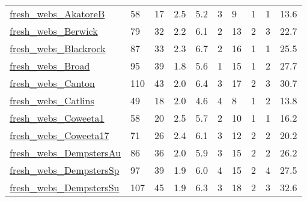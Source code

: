 \begin{longtable}{llllllllll}
 \href{https://iwdb.nceas.ucsb.edu/html/thomps_towns.html}{fresh\_webs\_AkatoreB}                                             & 58         & 17    & 2.5    & 5.2    & 3     & 9      & 1      & 1      & 13.6    \\
 \href{https://iwdb.nceas.ucsb.edu/html/thomps_towns.html}{fresh\_webs\_Berwick}                                              & 79         & 32    & 2.2    & 6.1    & 2     & 13     & 2      & 3      & 22.7    \\
 \href{https://iwdb.nceas.ucsb.edu/html/thomps_towns.html}{fresh\_webs\_Blackrock}                                            & 87         & 33    & 2.3    & 6.7    & 2     & 16     & 1      & 1      & 25.5    \\
 \href{https://iwdb.nceas.ucsb.edu/html/thomps_towns.html}{fresh\_webs\_Broad}                                                & 95         & 39    & 1.8    & 5.6    & 1     & 15     & 1      & 2      & 27.7    \\
 \href{https://iwdb.nceas.ucsb.edu/html/thomps_towns.html}{fresh\_webs\_Canton}                                               & 110        & 43    & 2.0    & 6.4    & 3     & 17     & 2      & 3      & 30.7    \\
 \href{https://iwdb.nceas.ucsb.edu/html/thomps_towns.html}{fresh\_webs\_Catlins}                                              & 49         & 18    & 2.0    & 4.6    & 4     & 8      & 1      & 2      & 13.8    \\
 \href{https://iwdb.nceas.ucsb.edu/html/thomps_towns.html}{fresh\_webs\_Coweeta1}                                             & 58         & 20    & 2.5    & 5.7    & 2     & 10     & 1      & 1      & 16.2    \\
 \href{https://iwdb.nceas.ucsb.edu/html/thomps_towns.html}{fresh\_webs\_Coweeta17}                                            & 71         & 26    & 2.4    & 6.1    & 3     & 12     & 2      & 2      & 20.2    \\
 \href{https://iwdb.nceas.ucsb.edu/html/thomps_towns.html}{fresh\_webs\_DempstersAu}                                          & 86         & 36    & 2.0    & 5.9    & 3     & 15     & 2      & 2      & 26.2    \\
 \href{https://iwdb.nceas.ucsb.edu/html/thomps_towns.html}{fresh\_webs\_DempstersSp}                                          & 97         & 39    & 1.9    & 6.0    & 4     & 15     & 2      & 4      & 27.5    \\
 \href{https://iwdb.nceas.ucsb.edu/html/thomps_towns.html}{fresh\_webs\_DempstersSu}                                          & 107        & 45    & 1.9    & 6.3    & 3     & 18     & 2      & 3      & 32.6    \\

\end{longtable}
